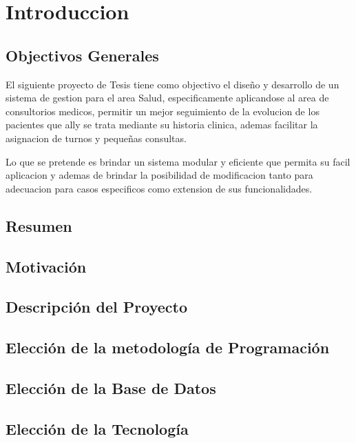 \chapter{Introduccion}

\section{Objectivos Generales}

El siguiente proyecto de Tesis tiene como objectivo el diseño y desarrollo de un
sistema de gestion para el area Salud, especificamente aplicandose al area de
consultorios medicos, permitir un mejor seguimiento de la evolucion de los pacientes
que ally se trata mediante su historia clinica, ademas facilitar la asignacion de
turnos y pequeñas consultas.

Lo que se pretende es brindar un sistema modular y eficiente que permita su facil aplicacion
y ademas de brindar la posibilidad de modificacion tanto para adecuacion para casos
especificos como extension de sus funcionalidades.

\section{Resumen}

\section{Motivación}

\section{Descripción del Proyecto}

\section{Elección de la metodología de Programación}

\section{Elección de la Base de Datos}

\section{Elección de la Tecnología}
